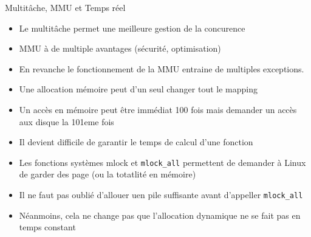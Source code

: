 









\begin{frame}{Multitâche, MMU et Temps réel} 
  \begin{itemize}
  \item Le multitâche permet une meilleure gestion de la concurence
  \item MMU à de multiple avantages (sécurité, optimisation)
  \item En revanche le fonctionnement  de la MMU entraine de multiples
    exceptions.
  \item Une allocation mémoire peut d'un seul changer tout le mapping
  \item Un accès en mémoire  peut être immédiat 100 fois mais demander
    un accès aux disque la 101eme fois
  \item  Il devient  difficile de  garantir le  temps de  calcul d'une
    fonction
  \item Les fonctions systèmes mlock et \texttt{mlock\_all} permettent
    de  demander  à Linux  de  garder des  page  (ou  la totatlité  en
    mémoire)
  \item  Il ne  faut pas  oublié d'allouer  uen pile  suffisante avant
    d'appeller \texttt{mlock\_all}
  \item Néanmoins, cela ne change pas que l'allocation dynamique ne se
    fait pas en temps constant
  \end{itemize} 
\end{frame} 



